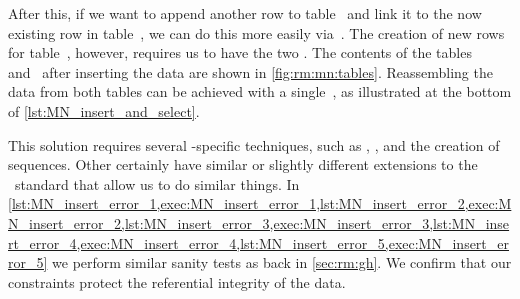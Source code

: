 %
After this, if we want to append  another row to table~ and link it to the now existing row in table~, we can do this more easily via~.
The creation of new rows for table~, however, requires us to have the two .
The contents of the tables~ and~ after inserting the data are shown in \cref{fig:rm:mn:tables}.
Reassembling the data from both tables can be achieved with a single~, as illustrated at the bottom of \cref{lst:MN_insert_and_select}.

This solution requires several \postgresql-specific techniques, such as , , and the creation of sequences.
Other  certainly have similar or slightly different extensions to the \sql\ standard that allow us to do similar things.
In \cref{lst:MN_insert_error_1,exec:MN_insert_error_1,lst:MN_insert_error_2,exec:MN_insert_error_2,lst:MN_insert_error_3,exec:MN_insert_error_3,lst:MN_insert_error_4,exec:MN_insert_error_4,lst:MN_insert_error_5,exec:MN_insert_error_5} we perform similar sanity tests as back in \cref{sec:rm:gh}.
We confirm that our constraints protect the referential integrity of the data.%
%
\FloatBarrier%
\endhsection%
%
